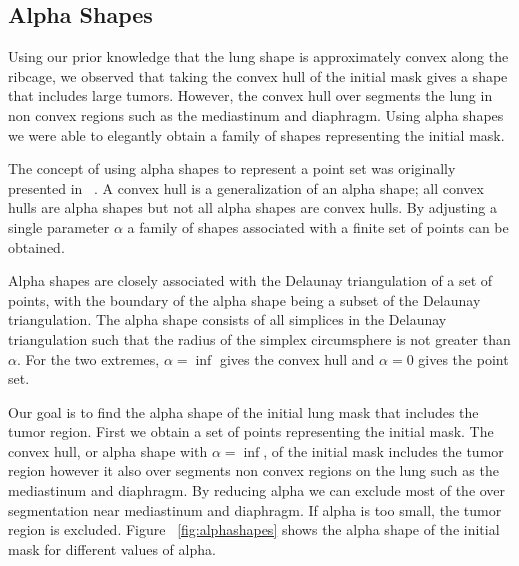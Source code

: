 \documentclass{llncs}
\begin{document}
\subsection{Alpha Shapes}
%
Using our prior knowledge that the lung shape is approximately convex along the ribcage, we observed that taking the convex hull of the initial mask gives a shape that includes large tumors. However, the convex hull over segments the lung in non convex regions such as the mediastinum and diaphragm. Using alpha shapes we were able to elegantly obtain a family of shapes representing the initial mask. 

The concept of using alpha shapes to represent a point set was originally presented in ~\cite{edelsbrunner1983}. A convex hull is a generalization of an alpha shape; all convex hulls are alpha shapes but not all alpha shapes are convex hulls. By adjusting a single parameter $\alpha$ a family of shapes associated with a finite set of points can be obtained.

Alpha shapes are closely associated with the Delaunay triangulation of a set of points, with the boundary of the alpha shape being a subset of the Delaunay triangulation. The alpha shape consists of all simplices in the Delaunay triangulation such that the radius of the simplex circumsphere is not greater than $ \alpha $. For the two extremes, $ \alpha=\inf $ gives the convex hull and  $ \alpha=0 $ gives the point set. 

Our goal is to find the alpha shape of the initial lung mask that includes the tumor region. First we obtain a set of points representing the initial mask. The convex hull, or alpha shape with $ \alpha = \inf $, of the initial mask includes the tumor region however it also over segments non convex regions on the lung such as the mediastinum and diaphragm. By reducing alpha we can exclude most of the over segmentation near mediastinum and diaphragm. If alpha is too small, the tumor region is excluded. Figure ~\ref{fig:alphashapes} shows the alpha shape of the initial mask for different values of alpha. 
\end{document}
